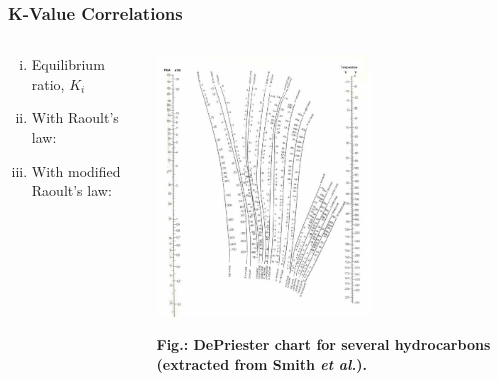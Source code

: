 \documentclass[10pt,compress,handout,ignorenonframetext,unknownkeysallowed]{beamer}
\begin{document}
\begin{frame}
  \frametitle{K-Value Correlations}
  \begin{columns}
     \begin{column}[l]{0.5\linewidth}
        \begin{enumerate}[i)]
           \item<1-> Equilibrium ratio, $K_{i}$
           \item<2-> With Raoult's law:
           \item<3-> With modified Raoult's law:
        \end{enumerate}
     \end{column}
     \begin{column}[l]{0.5\linewidth}
        \begin{center}
          \hspace{-.8cm}\includegraphics[width=5.7cm,clip]{./../Pics/02_07_fig_02.png}
          
          \tiny{\bf{Fig.:} DePriester chart for several hydrocarbons (extracted from Smith {\it et al.}).}
        \end{center}
     \end{column}
   \end{columns}
\end{frame}
\end{document}

